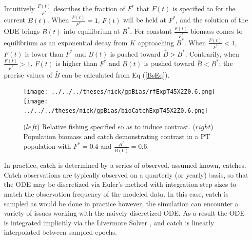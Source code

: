 \documentclass[12pt]{article}
\begin{document}
%
Intuitively $\frac{F(t)}{F^*}$ describes the fraction of $F^*$ that $F(t)$ is  
specified to for the current $B(t)$. When $\frac{F(t)}{F^*}=1$, $F(t)$ will be 
held at $F^*$, and the solution of the ODE brings $B(t)$ into equilibrium at 
$B^*$. For constant $\frac{F(t)}{F^*}$ biomass %
comes to equilibrium as an exponential decay from $K$ approaching $B^*$. 
When $\frac{F(t)}{F^*}<1$, $F(t)$ is lower than $F^*$ and $B(t)$ is pushed 
toward $\bar B>B^*$. Contrarily, when $\frac{F(t)}{F^*}>1$, $F(t)$ is higher 
than $F^*$ and $B(t)$ is pushed toward $\bar B<B^*$; the precise values of 
$\bar B$ can be calculated from Eq (\ref{BsEq}).

%
\begin{figure}[h!]
\texttt{[image: ../../../theses/nick/gpBias/rfExpT45X2Z0.6.png]}
\texttt{[image: ../../../theses/nick/gpBias/bioCatchExpT45X2Z0.6.png]}
\caption{ \label{catchT45}
($left$) Relative fishing specified so as to induce contrast.
($right$) Population biomass and catch demonstrating contrast in a {\color{red}PT population} with $F^*=0.4$ and $\frac{B^*}{\bar B(0)}=0.6$.
}
\end{figure}

%
\clearpage
%
In practice, catch is determined by a series of observed, assumed known, catches. 
Catch observations are typically observed on a quarterly (or yearly) basis, so 
that the ODE may be discretized via Euler’s method with integration step sizes 
to match the observation frequency of the modeled data. In this case, catch is sampled 
as would be done in practice however, the simulation can encounter a variety of issues 
working with the naively discretized ODE. As a result the ODE is integrated implicitly 
via the Livermore Solver , and catch 
is linearly interpolated between sampled epochs. 

\end{document}
